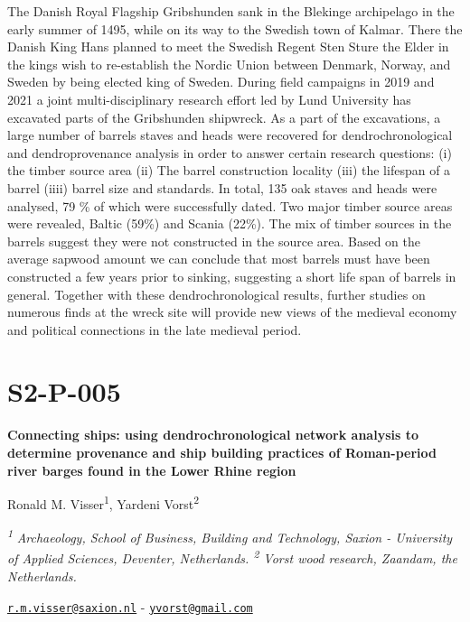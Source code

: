 \documentclass[
]{book}
\begin{document}
The Danish Royal Flagship Gribshunden sank in the Blekinge archipelago in the early summer of 1495, while on its way to the Swedish town of Kalmar. There the Danish King Hans planned to meet the Swedish Regent Sten Sture the Elder in the kings wish to re-establish the Nordic Union between Denmark, Norway, and Sweden by being elected king of Sweden. During field campaigns in 2019 and 2021 a joint multi-disciplinary research effort led by Lund University has excavated parts of the Gribshunden shipwreck. As a part of the excavations, a large number of barrels staves and heads were recovered for dendrochronological and dendroprovenance analysis in order to answer certain research questions: (i) the timber source area (ii) The barrel construction locality (iii) the lifespan of a barrel (iiii) barrel size and standards. In total, 135 oak staves and heads were analysed, 79 \% of which were successfully dated. Two major timber source areas were revealed, Baltic (59\%) and Scania (22\%). The mix of timber sources in the barrels suggest they were not constructed in the source area. Based on the average sapwood amount we can conclude that most barrels must have been constructed a few years prior to sinking, suggesting a short life span of barrels in general. Together with these dendrochronological results, further studies on numerous finds at the wreck site will provide new views of the medieval economy and political connections in the late medieval period.

\hypertarget{s2-p-005}{%
\section*{S2-P-005}\label{s2-p-005}}

\textbf{Connecting ships: using dendrochronological network analysis to determine provenance and ship building practices of Roman-period river barges found in the Lower Rhine region}

Ronald M. Visser\textsuperscript{1}, Yardeni Vorst\textsuperscript{2}

\textsuperscript{\emph{1}} \emph{Archaeology, School of Business, Building and Technology, Saxion - University of Applied Sciences, Deventer, Netherlands. \textsuperscript{2} Vorst wood research, Zaandam, the Netherlands.}

\href{mailto:r.m.visser@saxion.nl}{\nolinkurl{r.m.visser@saxion.nl}} - \href{mailto:yvorst@gmail.com}{\nolinkurl{yvorst@gmail.com}}
\end{document}
